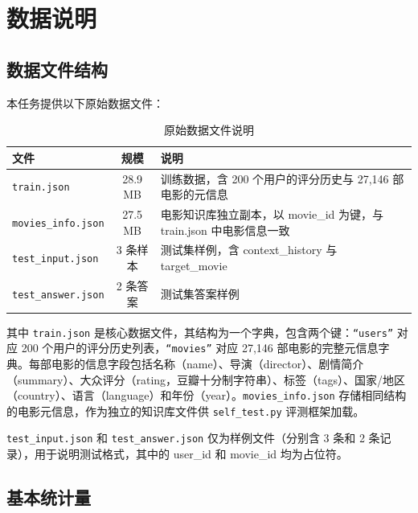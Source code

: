 \documentclass[UTF8,a4paper,10pt,fontset=none]{ctexart}
\begin{document}
\section{数据说明}

\subsection{数据文件结构}

本任务提供以下原始数据文件：

\begin{table}[htbp]
    \centering
    \setlength{\tabcolsep}{14pt}
    \caption{原始数据文件说明}
    \label{tab:files}
    \begin{tabular}{@{}lcp{}@{}}
        \toprule
        \textbf{文件} & \textbf{规模} & \textbf{说明} \\
        \midrule
        \texttt{train.json} & 28.9 MB & 训练数据，含 200 个用户的评分历史与 27,146 部电影的元信息 \\
        \texttt{movies\_info.json} & 27.5 MB & 电影知识库独立副本，以 movie\_id 为键，与 train.json 中电影信息一致 \\
        \texttt{test\_input.json} & 3 条样本 & 测试集样例，含 context\_history 与 target\_movie \\
        \texttt{test\_answer.json} & 2 条答案 & 测试集答案样例 \\
        \bottomrule
    \end{tabular}
\end{table}

其中 \texttt{train.json} 是核心数据文件，其结构为一个字典，包含两个键：\texttt{“users”} 对应 200 个用户的评分历史列表，\texttt{“movies”} 对应 27,146 部电影的完整元信息字典。每部电影的信息字段包括名称（name）、导演（director）、剧情简介（summary）、大众评分（rating，豆瓣十分制字符串）、标签（tags）、国家/地区（country）、语言（language）和年份（year）。\texttt{movies\_info.json} 存储相同结构的电影元信息，作为独立的知识库文件供 \texttt{self\_test.py} 评测框架加载。

\texttt{test\_input.json} 和 \texttt{test\_answer.json} 仅为样例文件（分别含 3 条和 2 条记录），用于说明测试格式，其中的 user\_id 和 movie\_id 均为占位符。

\subsection{基本统计量}
\end{document}
